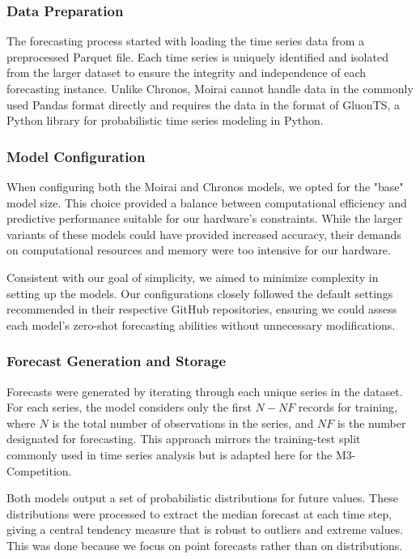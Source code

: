 \documentclass[12pt,a4paper]{article}
\begin{document}
\subsubsection{Data Preparation}

The forecasting process started with loading the time series data from a preprocessed Parquet file. Each time series is uniquely identified and isolated from the larger dataset to ensure the integrity and independence of each forecasting instance. Unlike Chronos, Moirai cannot handle data in the commonly used Pandas format directly and requires the data in the format of GluonTS, a Python library for probabilistic time series modeling in Python. 

\subsubsection{Model Configuration}

When configuring both the Moirai and Chronos models, we opted for the "base" model size. This choice provided a balance between computational efficiency and predictive performance suitable for our hardware's constraints. While the larger variants of these models could have provided increased accuracy, their demands on computational resources and memory were too intensive for our hardware.

Consistent with our goal of simplicity, we aimed to minimize complexity in setting up the models. Our configurations closely followed the default settings recommended in their respective GitHub repositories, ensuring we could assess each model's zero-shot forecasting abilities without unnecessary modifications. 

\subsubsection{Forecast Generation and Storage}

Forecasts were generated by iterating through each unique series in the dataset. For each series, the model considers only the first $N-NF$ records for training, where $N$ is the total number of observations in the series, and $NF$ is the number designated for forecasting. This approach mirrors the training-test split commonly used in time series analysis but is adapted here for the M3-Competition.

Both models output a set of probabilistic distributions for future values. These distributions were processed to extract the median forecast at each time step, giving a central tendency measure that is robust to outliers and extreme values. This was done because we focus on point forecasts rather than on distributions.
\end{document}
